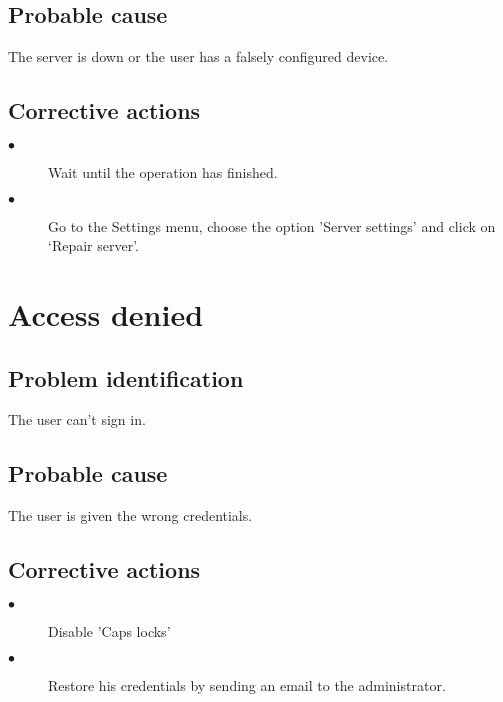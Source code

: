 \subsection{Probable cause}
The server is down or the user has a falsely configured device.

\subsection{Corrective actions}
\begin{description} 
\item[$\bullet$] Wait until the operation has finished.
\item[$\bullet$] Go to the Settings menu, choose the option 'Server settings'
and click on `Repair server'.
\end{description} 

\section{Access denied}

\subsection{Problem identification}
The user can't sign in.\\

\subsection{Probable cause}
The user is given the wrong credentials.

\subsection{Corrective actions}
\begin{description} 
\item[$\bullet$] Disable 'Caps locks'
\item[$\bullet$] Restore his credentials by sending an email to the
administrator.
\end{description}